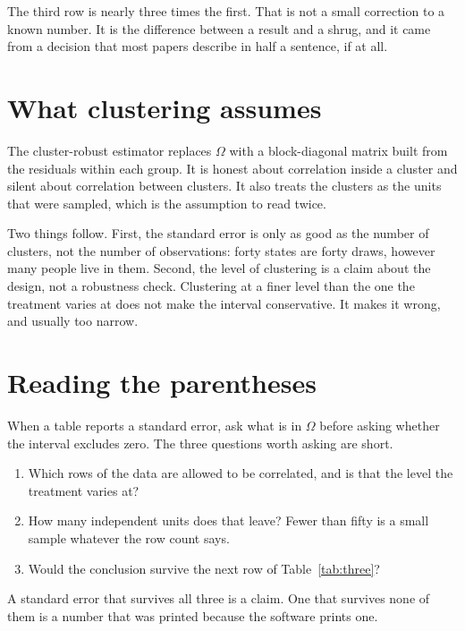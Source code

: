 \documentclass[11pt]{article}
\begin{document}
The third row is nearly three times the first. That is not a small correction to a known number. It is the difference between a result and a shrug, and it came from a decision that most papers describe in half a sentence, if at all.

\section{What clustering assumes}

The cluster-robust estimator replaces $\Omega$ with a block-diagonal matrix built from the residuals within each group. It is honest about correlation inside a cluster and silent about correlation between clusters. It also treats the clusters as the units that were sampled, which is the assumption to read twice.

Two things follow. First, the standard error is only as good as the number of clusters, not the number of observations: forty states are forty draws, however many people live in them. Second, the level of clustering is a claim about the design, not a robustness check. Clustering at a finer level than the one the treatment varies at does not make the interval conservative. It makes it wrong, and usually too narrow.

\section{Reading the parentheses}

When a table reports a standard error, ask what is in $\Omega$ before asking whether the interval excludes zero. The three questions worth asking are short.

\begin{enumerate}
  \item Which rows of the data are allowed to be correlated, and is that the level the treatment varies at?
  \item How many independent units does that leave? Fewer than fifty is a small sample whatever the row count says.
  \item Would the conclusion survive the next row of Table~\ref{tab:three}?
\end{enumerate}

A standard error that survives all three is a claim. One that survives none of them is a number that was printed because the software prints one.
\end{document}
